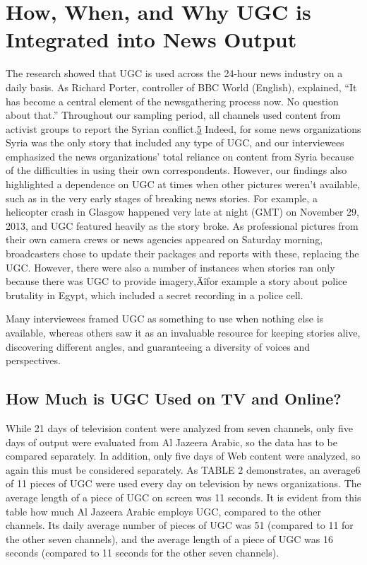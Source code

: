 \documentclass[symmetric, notoc, nobib]{towcenter-book}
\begin{document}
\chapter{How, When, and Why UGC is Integrated into News Output}
The research showed that UGC is used across the 24-hour news industry
on a daily basis. As Richard Porter, controller of BBC World (English),
explained, ``It has become a central element of the newsgathering process
now. No question about that.''
Throughout our sampling period, all channels used content from activist
groups to report the Syrian conflict.{\href{#endnotes}{5}} Indeed, for some news organizations
Syria was the only story that included any type of UGC, and our interviewees
emphasized the news organizations' total reliance on content from Syria
because of the difficulties in using their own correspondents. However, our
findings also highlighted a dependence on UGC at times when other pictures
weren't available, such as in the very early stages of breaking news
stories. For example, a helicopter crash in Glasgow happened very late at
night (GMT) on November 29, 2013, and UGC featured heavily as the story
broke. As professional pictures from their own camera crews or news agencies
appeared on Saturday morning, broadcasters chose to update their
packages and reports with these, replacing the UGC.
However, there were also a number of instances when stories ran only
because there was UGC to provide imagery‚Äîfor example a story about
police brutality in Egypt, which included a secret recording in a police cell.

Many interviewees framed UGC as something to use when nothing else is
available, whereas others saw it as an invaluable resource for keeping stories
alive, discovering different angles, and guaranteeing a diversity of voices
and perspectives.
\section{How Much is UGC Used on TV and Online?}
While 21 days of television content were analyzed from seven channels,
only five days of output were evaluated from Al Jazeera Arabic, so the data
has to be compared separately. In addition, only five days of Web content
were analyzed, so again this must be considered separately.
As TABLE 2 demonstrates, an average6 of 11 pieces of UGC were used every
day on television by news organizations. The average length of a piece of
UGC on screen was 11 seconds. It is evident from this table how much
Al Jazeera Arabic employs UGC, compared to the other channels. Its daily
average number of pieces of UGC was 51 (compared to 11 for the other
seven channels), and the average length of a piece of UGC was 16 seconds
(compared to 11 seconds for the other seven channels).
\end{document}
